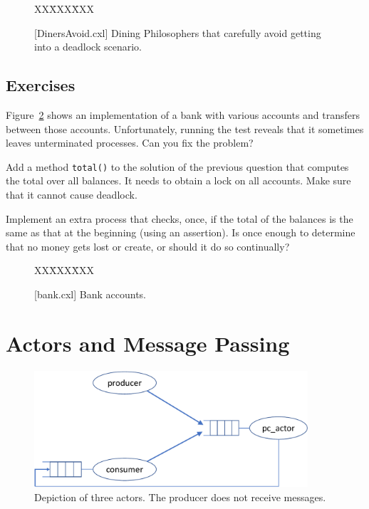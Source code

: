 \documentclass{report}
\newcommand{\cxlsource}[1]{
\begin{tabbing}
XX\=XXX\=XXX\kill
    
\end{tabbing}
}
\newenvironment{code}{
\tcolorbox
}{
\endtcolorbox
}
\begin{document}
\begin{figure}
\begin{code}
\cxlsource{DinersAvoid}
\end{code}
\caption{[DinersAvoid.cxl] Dining Philosophers that carefully avoid getting into a deadlock
scenario.}
\label{fig:dinersavoid}
\end{figure}

\section*{Exercises}
\begin{problems}
\item \label{ex:bank} Figure~\ref{fig:bank} shows an implementation of a bank with various
accounts and transfers between those accounts.
Unfortunately, running the test reveals that it sometimes leaves unterminated
processes.  Can you fix the problem?
\item Add a method \texttt{total()} to the solution of the previous question
that computes the total over all balances.
It needs to obtain a lock on all accounts.  Make sure that
it cannot cause deadlock.
\item Implement an extra process that checks, once, if the total of
the balances is the same as that at the beginning (using an assertion).
Is once enough to determine that no money gets lost or create, or should it do
so continually?
\end{problems}

\begin{figure}
\begin{code}
\cxlsource{bank}
\end{code}
\caption{[bank.cxl] Bank accounts.}
\label{fig:bank}
\end{figure}

\chapter{Actors and Message Passing}
\label{ch:actor}


\begin{figure}
\begin{center}
\includegraphics[width=4in]{figures/actor-crop.pdf}
\end{center}
\caption{Depiction of three actors.  The producer does not receive messages.}
\label{fig:actorpic}
\end{figure}
\end{document}
